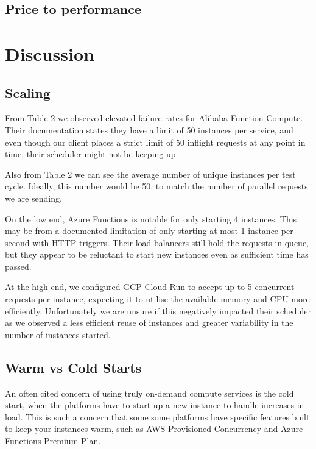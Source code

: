 \documentclass[11pt]{article}
\begin{document}

\subsection{Price to performance}



\section{Discussion}

\subsection{Scaling}
From Table 2 %
we observed elevated failure rates for Alibaba Function Compute.
Their documentation %
states they have a limit of 50 instances per service,
and even though our client places a strict limit of 50 inflight requests at any point in time,
their scheduler might not be keeping up.

Also from Table 2 %
we can see the average number of unique instances per test cycle.
Ideally, this number would be 50,
to match the number of parallel requests we are sending.

On the low end,
Azure Functions is notable for only starting 4 instances.
This may be from a documented limitation %
of only starting at most 1 instance per second with HTTP triggers.
Their load balancers still hold the requests in queue,
but they appear to be reluctant to start new instances even as sufficient time has passed.

At the high end,
we configured GCP Cloud Run to accept up to 5 concurrent requests per instance,
expecting it to utilise the available memory and CPU more efficiently.
Unfortunately we are unsure if this negatively impacted their scheduler
as we observed a less efficient reuse of instances
and greater variability in the number of instances started.

\subsection{Warm vs Cold Starts}
An often cited concern of using truly on-demand compute services is the cold start,
when the platforms have to start up a new instance to handle increases in load.
This is such a concern that some some platforms have specific features
built to keep your instances warm, such as AWS Provisioned Concurrency %
and Azure Functions Premium Plan.
\end{document}
